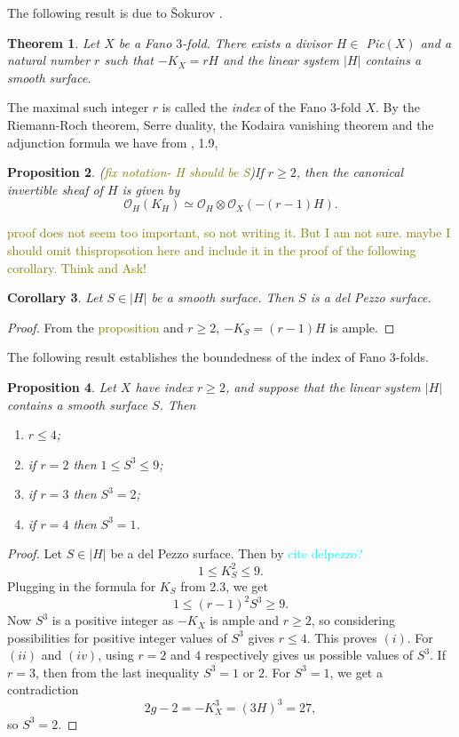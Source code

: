 \documentclass[11pt]{amsart}
\theoremstyle{plain}
\newtheorem{theorem}{Theorem}[section]
\newtheorem{corollary}[theorem]{Corollary}
\newtheorem{proposition}[theorem]{Proposition}
\theoremstyle{definition}
\theoremstyle{expl}
\begin{document}
\noindent The following result is due to \v{S}okurov \cite{Sokudivisor}.
\begin{theorem}
\label{B}
Let $X$ be a Fano $3$-fold. There exists a divisor $H \in$ Pic$(X)$ and a natural number $r$ such that $-K_X = rH$ and the linear system $|H|$ contains a smooth surface.
\end{theorem}
The maximal such integer $r$ is called the \textit{index} of the Fano $3$-fold $X$. 
By the Riemann-Roch theorem, Serre duality, the Kodaira vanishing theorem and the adjunction formula we have from \cite{Isk77}, 1.9,
\begin{proposition}
    (\textcolor{olive}{fix notation- H should be S})If $r \geq 2$, then the canonical invertible sheaf of $H$ is given by 
    \[
    \mathcal{O}_H(K_{H}) \simeq \mathcal{O}_H \otimes \mathcal{O}_X(-(r-1)H).
    \]
\end{proposition}
\textcolor{olive}{proof does not seem too important, so not writing it. But I am not sure. maybe I should omit thispropsotion here and include it in the proof of the following corollary. Think and Ask!}\\
\begin{corollary}
 Let $S \in |H|$ be a smooth surface. Then $S$ is a del Pezzo surface. 	
\end{corollary}
\begin{proof}
 From the \textcolor{olive}{proposition} and $r\geq 2$, $-K_S = (r-1)H$ is ample. 
\end{proof}
\noindent The following result establishes the boundedness of the index of Fano $3$-folds. 
\begin{proposition}
    Let $X$ have index $r\geq 2$, and suppose that the linear system $|H|$ contains a smooth surface $S$. Then 
    \begin{enumerate}
        \item[(i)] $r \leq 4$;
        \item[(ii)] if $r=2$ then $1 \leq S^3 \leq 9$;
        \item[(ii)] if $r=3$ then $S^3=2$;
        \item[(iv)] if $r=4$ then $S^3=1$.
    \end{enumerate}
\end{proposition}
\begin{proof}
	Let $S \in |H|$ be a del Pezzo surface. Then by  \textcolor{cyan}{cite delpezzo?} 
   \[ 1\leq K_S^2 \leq 9.\]
Plugging in the formula for $K_S$ from 2.3, we get 
\[
1 \leq (r-1)^2 S^3 \geq 9.
\]   
Now $S^3$ is a positive integer	as $-K_X$ is ample and $r\geq 2$, so considering possibilities for positive integer values of $S^3$ gives $r\leq 4$. This proves $(i)$. For $(ii)$ and $(iv)$, using $r=2$ and $4$ respectively gives us possible values of $S^3$. If $r=3$, then from the last inequality $S^3 =1$ or $2$. For $S^3=1$, we get a contradiction
\[
2g-2 = -K_X^3 = (3H)^3 = 27,
\]
so $S^3=2$.		
		
		
\end{proof}
\end{document}
